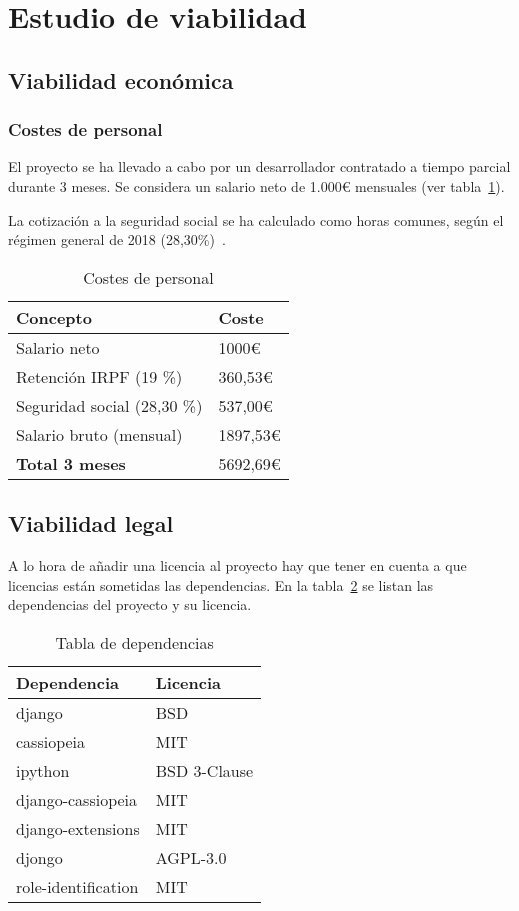 \section{Estudio de viabilidad}

\subsection{Viabilidad económica}
\subsubsection{Costes de personal}
El proyecto se ha llevado a cabo por un desarrollador contratado a tiempo parcial durante 3 meses. Se considera un salario neto de 1.000€ mensuales
(ver tabla~\ref{tab:personal}).

La cotización a la seguridad social se ha calculado como horas comunes, según
el régimen general de 2018 (28,30\%)~\cite{seguridad-social}.

\begin{table}[!h]
	\centering
	\begin{tabular}{ll}
		\toprule
		\textbf{Concepto} & \textbf{Coste} \\
		\midrule
		Salario neto & 1000€\\
		Retención IRPF (19 \%) & 360,53€ \\
		Seguridad social (28,30 \%) & 537,00€ \\
		\midrule
		Salario bruto (mensual) & 1897,53€ \\
		\midrule
		\textbf{Total 3 meses} & 5692,69€ \\
		\bottomrule
	\end{tabular}
	\caption{Costes de personal}
	\label{tab:personal}
\end{table}

\subsection{Viabilidad legal}
A lo hora de añadir una licencia al proyecto hay que tener en cuenta a que licencias están sometidas las dependencias. En la tabla~\ref{tab:dependencias} se listan las dependencias del proyecto y su licencia.

\begin{table}[h]
	\centering
	\begin{tabular}{ll}\toprule
		\textbf{Dependencia}         & \textbf{Licencia}     \\ \midrule
		django              & BSD          \\
		cassiopeia          & MIT          \\
		ipython             & BSD 3-Clause \\
		django-cassiopeia   & MIT          \\
		django-extensions   & MIT          \\
		djongo              & AGPL-3.0     \\
		role-identification & MIT          \\ \bottomrule
	\end{tabular}
	\caption{Tabla de dependencias}
	\label{tab:dependencias}
\end{table}

